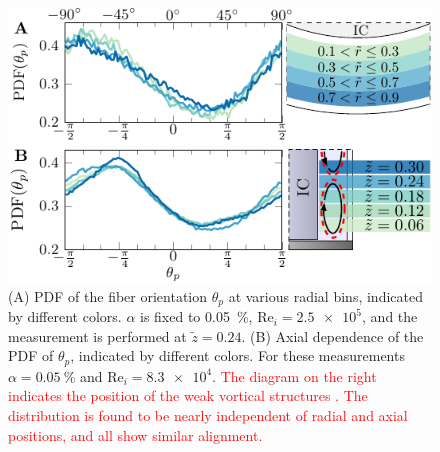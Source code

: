 \documentclass[aps, pre, onecolumn, superscriptaddress,longbibliography]{revtex4-1}
\newcommand{\makered}[1]{\textcolor{red}{#1}}
\begin{document}
\begin{figure}[htp]
\centering
\includegraphics[scale=1.2]{figure11_orient_r_z}
\caption{(A) PDF of the fiber orientation $\theta_p$ at various radial bins,
indicated by different colors. $\alpha$ is fixed to \SI{0.05}{\percent},
$\text{Re}_i = \num{2.5e5}$, and the measurement is performed at $\tilde{z} =
0.24$. (B) Axial dependence of the PDF of $\theta_p$, indicated by different
colors. For these measurements $\alpha=\SI{0.05}{\percent}$ and
$\text{Re}_i=\num{8.3e4}$. \makered{The diagram on the right indicates the position of the weak vortical structures \cite{Huisman2014,vanderVeen2016}.
The distribution is found to be nearly independent
of radial and axial positions, and all show similar
alignment.}}
\label{fig:orientrz}
\end{figure}
\end{document}
